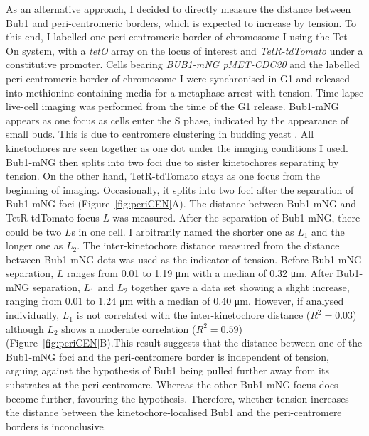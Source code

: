 As an alternative approach, I decided to directly measure the distance between Bub1 and peri-centromeric borders, which is expected to increase by tension. To this end, I labelled one peri-centromeric border of chromosome I using the Tet-On system, with a \textit{tetO} array on the locus of interest and \textit{TetR-tdTomato} under a constitutive promoter. Cells bearing \textit{BUB1-mNG pMET-CDC20} and the labelled peri-centromeric border of chromosome I were synchronised in G1 and released into methionine-containing media for a metaphase arrest with tension. Time-lapse live-cell imaging was performed from the time of the G1 release. Bub1-mNG appears as one focus as cells enter the S phase, indicated by the appearance of small buds. This is due to centromere clustering in budding yeast \citep{Taddei2012StructureNucleus}. All kinetochores are seen together as one dot under the imaging conditions I used. Bub1-mNG then splits into two foci due to sister kinetochores separating by tension. On the other hand, TetR-tdTomato stays as one focus from the beginning of imaging. Occasionally, it splits into two foci after the separation of Bub1-mNG foci (Figure~\ref{fig:periCEN}A). The distance between Bub1-mNG and TetR-tdTomato focus $L$ was measured. After the separation of Bub1-mNG, there could be two $L$s in one cell. I arbitrarily named the shorter one as $L_{1}$ and the longer one as $L_{2}$. The inter-kinetochore distance measured from the distance between Bub1-mNG dots was used as the indicator of tension. Before Bub1-mNG separation, $L$ ranges from 0.01 to 1.19 \si{\micro\metre} with a median of 0.32 \si{\micro\metre}. After Bub1-mNG separation, $L_{1}$ and $L_{2}$ together gave a data set showing a slight increase, ranging from 0.01 to 1.24 \si{\micro\metre} with a median of 0.40 \si{\micro\metre}. However, if analysed individually, $L_{1}$ is not correlated with the inter-kinetochore distance ($R^2 = 0.03$) although $L_{2}$ shows a moderate correlation ($R^2 = 0.59$) (Figure~\ref{fig:periCEN}B).This result suggests that the distance between one of the Bub1-mNG foci and the peri-centromere border is independent of tension, arguing against the hypothesis of Bub1 being pulled further away from its substrates at the peri-centromere. Whereas the other Bub1-mNG focus does become further, favouring the hypothesis. Therefore, whether tension increases the distance between the kinetochore-localised Bub1 and the peri-centromere borders is inconclusive. 

